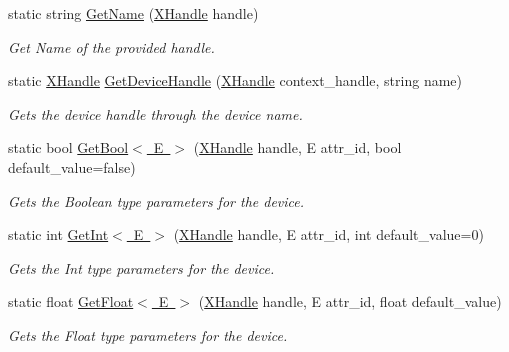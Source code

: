 \begin{DoxyCompactItemize}
static string \mbox{\hyperlink{class_ximmerse_1_1_input_system_1_1_x_device_plugin_a86c25965f67c18e3203a86104724dbd0}{Get\+Name}} (\mbox{\hyperlink{class_ximmerse_1_1_input_system_1_1_x_device_plugin_1_1_x_handle}{X\+Handle}} handle)
\begin{DoxyCompactList}\small\item\em Get Name of the provided handle. \end{DoxyCompactList}\item 
static \mbox{\hyperlink{class_ximmerse_1_1_input_system_1_1_x_device_plugin_1_1_x_handle}{X\+Handle}} \mbox{\hyperlink{class_ximmerse_1_1_input_system_1_1_x_device_plugin_a90fa79ef1d8350ae533cece026a0ba6e}{Get\+Device\+Handle}} (\mbox{\hyperlink{class_ximmerse_1_1_input_system_1_1_x_device_plugin_1_1_x_handle}{X\+Handle}} context\+\_\+handle, string name)
\begin{DoxyCompactList}\small\item\em Gets the device handle through the device name. \end{DoxyCompactList}\item 
static bool \mbox{\hyperlink{class_ximmerse_1_1_input_system_1_1_x_device_plugin_a35864c46a7e5434e8909a928f62e0ac3}{Get\+Bool$<$ E $>$}} (\mbox{\hyperlink{class_ximmerse_1_1_input_system_1_1_x_device_plugin_1_1_x_handle}{X\+Handle}} handle, E attr\+\_\+id, bool default\+\_\+value=false)
\begin{DoxyCompactList}\small\item\em Gets the Boolean type parameters for the device. \end{DoxyCompactList}\item 
static int \mbox{\hyperlink{class_ximmerse_1_1_input_system_1_1_x_device_plugin_a0e4fb349f5b6215c2e3434a41540f758}{Get\+Int$<$ E $>$}} (\mbox{\hyperlink{class_ximmerse_1_1_input_system_1_1_x_device_plugin_1_1_x_handle}{X\+Handle}} handle, E attr\+\_\+id, int default\+\_\+value=0)
\begin{DoxyCompactList}\small\item\em Gets the Int type parameters for the device. \end{DoxyCompactList}\item 
static float \mbox{\hyperlink{class_ximmerse_1_1_input_system_1_1_x_device_plugin_a1d651426ac147b7982f1861d08484774}{Get\+Float$<$ E $>$}} (\mbox{\hyperlink{class_ximmerse_1_1_input_system_1_1_x_device_plugin_1_1_x_handle}{X\+Handle}} handle, E attr\+\_\+id, float default\+\_\+value)
\begin{DoxyCompactList}\small\item\em Gets the Float type parameters for the device. \end{DoxyCompactList}\item 

\end{DoxyCompactItemize}

